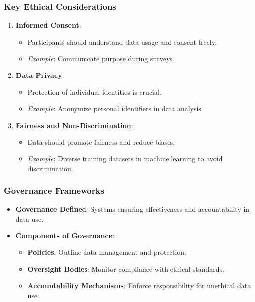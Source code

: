 \documentclass[aspectratio=169]{beamer}
\begin{document}
\begin{frame}[fragile]
    \frametitle{Key Ethical Considerations}
    \begin{enumerate}
        \item \textbf{Informed Consent}:
        \begin{itemize}
            \item Participants should understand data usage and consent freely.
            \item \textit{Example}: Communicate purpose during surveys.
        \end{itemize}

        \item \textbf{Data Privacy}:
        \begin{itemize}
            \item Protection of individual identities is crucial.
            \item \textit{Example}: Anonymize personal identifiers in data analysis.
        \end{itemize}

        \item \textbf{Fairness and Non-Discrimination}:
        \begin{itemize}
            \item Data should promote fairness and reduce biases.
            \item \textit{Example}: Diverse training datasets in machine learning to avoid discrimination.
        \end{itemize}
    \end{enumerate}
\end{frame}

\begin{frame}[fragile]
    \frametitle{Governance Frameworks}
    \begin{itemize}
        \item \textbf{Governance Defined}: Systems ensuring effectiveness and accountability in data use.
        \item \textbf{Components of Governance}:
        \begin{itemize}
            \item \textbf{Policies}: Outline data management and protection.
            \item \textbf{Oversight Bodies}: Monitor compliance with ethical standards.
            \item \textbf{Accountability Mechanisms}: Enforce responsibility for unethical data use.
        \end{itemize}
    \end{itemize}
\end{frame}
\end{document}

